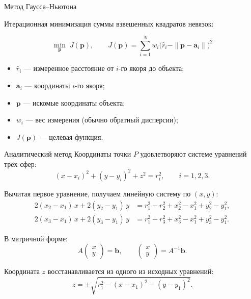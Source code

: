 \documentclass[10pt]{beamer}
\begin{document}
\begin{frame}{Метод Гаусса--Ньютона}
\justifying

Итерационная минимизация суммы взвешенных квадратов невязок:

\begin{equation*}
\boxed{\;\min_{\mathbf{p}}\; J(\mathbf{p}),
\qquad
J(\mathbf{p}) = \sum_{i=1}^{N} w_i \bigl(\hat r_i - \|\mathbf{p} - \mathbf{a}_i\|\bigr)^2\;}
\end{equation*}

\bigskip

\begin{itemize}
\item $\hat r_i$ — измеренное расстояние от $i$-го якоря до объекта;
\item $\mathbf{a}_i$ — координаты $i$-го якоря;
\item $\mathbf{p}$ — искомые координаты объекта;
\item $w_i$ — вес измерения (обычно обратный дисперсии);
\item $J(\mathbf{p})$ — целевая функция.
\end{itemize}

\end{frame}


\begin{frame}{Аналитический метод}
\justifying
Координаты точки $P$ удовлетворяют системе уравнений трёх сфер:
\begin{equation*}
(x - x_i)^2 + (y - y_i)^2 + z^2 = r_i^2, \qquad i = 1, 2, 3.
\end{equation*}

\smallskip

Вычитая первое уравнение, получаем линейную систему по $(x, y)$:
\begin{align*}
2(x_2 - x_1)\,x + 2(y_2 - y_1)\,y &= r_1^2 - r_2^2 + x_2^2 - x_1^2 + y_2^2 - y_1^2, \\
2(x_3 - x_1)\,x + 2(y_3 - y_1)\,y &= r_1^2 - r_3^2 + x_3^2 - x_1^2 + y_3^2 - y_1^2.
\end{align*}

\smallskip

В матричной форме:
\begin{equation*}
A \begin{pmatrix} x \\ y \end{pmatrix} = \mathbf{b},
\qquad
\begin{pmatrix} x \\ y \end{pmatrix} = A^{-1} \mathbf{b}.
\end{equation*}

\smallskip

Координата $z$ восстанавливается из одного из исходных уравнений:
\begin{equation*}
z = \pm\sqrt{r_1^2 - (x - x_1)^2 - (y - y_1)^2}.
\end{equation*}

\end{frame}
\end{document}
